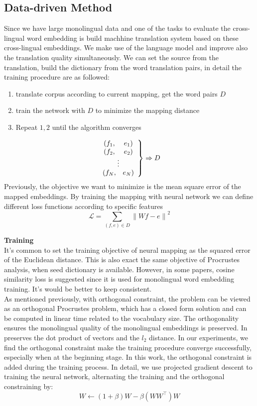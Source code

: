 \subsection{Data-driven Method}
Since we have large monolingual data and one of the tasks to evaluate the cross-lingual word embedding is build machhine translation system based on these cross-lingual embeddings. We make use of the language model and improve also the translation quality simultaneously. We can set the source from the translation, build the dictionary from the word translation pairs, in detail the training procedure are as followed:
\begin{enumerate}
	\item translate corpus according to current mapping, get the word pairs $D$
	\item train the network with $D$ to minimize the mapping distance
	\item Repeat $1,2$ until the algorithm converges
\end{enumerate}
		\[ 
		\left. \begin{array}{c c} 
		(f_1,& e_1)\\
		(f_2,& e_2)\\
		\multicolumn{2}{c}{\vdots}\\
		(f_N,& e_N)
		\end{array} \right\} 
		\Rightarrow D
		\]
Previously, the objective we want to minimize is the mean square error of the mapped embeddings. By training the mapping with neural network we can define different loss functions according to specific features
		\[\mathcal{L} = \sum_{(f,e)\in D} {\lVert Wf - e \rVert}^2  \]





\textbf{Training}\\
It's common to set the training objective of neural mapping as the squared error of the Euclidean distance. This is also exact the same objective of Procrustes analysis, when seed dictionary is available. However, in some papers, cosine similarity loss is suggested since it is used for monolingual word embedding training. It's would be better to keep consistent.  \\
As mentioned previously, with orthogonal constraint, the problem can be viewed as an orthogonal Procrustes problem, which has a closed form solution and can be computed in linear time related to the vocabulary size. The orthogonality ensures the monolingual quality of the monolingual embeddings is preserved. In preserves the dot product of vectors and the $l_2$ distance.  In our experiments, we find the orthogonal constraint make the training procedure converge successfully, especially when at the beginning stage.
In this work, the orthogonal constraint is added during the training process. In detail, we use projected gradient descent to training the neural network, alternating the training and the orthogonal constraining by:
\[ W \leftarrow (1+\beta) W - \beta(WW^\top)W\]

